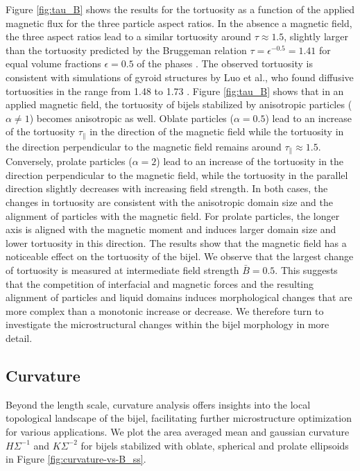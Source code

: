 Figure \ref{fig:tau_B} shows the results for the tortuosity as a
function of the applied magnetic flux for the three particle aspect
ratios. In the absence a magnetic field, the three aspect ratios lead to
a similar tortuosity around $\tau\approx 1.5$, slightly larger than
the tortuosity predicted by the Bruggeman relation
\(\tau=\epsilon^{-0.5}=1.41\) for equal volume fractions
\(\epsilon=0.5\) of the phases
\cite{bruggeman1935tortuosity, tjaden_origin_2016}. The observed
tortuosity is consistent with simulations of gyroid structures by Luo et
al., who found diffusive tortuosities in the range from 1.48 to 1.73
\cite{luo_macroscopic_2020}. Figure \ref{fig:tau_B} shows that in an
applied magnetic field, the tortuosity of bijels stabilized by
anisotropic particles (\(\alpha\neq1\)) becomes anisotropic as well.
Oblate particles (\(\alpha=0.5\)) lead to an increase of the tortuosity
\(\tau_\parallel\) in the direction of the magnetic field while the
tortuosity in the direction perpendicular to the magnetic field remains
around \(\tau_\parallel\approx1.5\). Conversely, prolate particles
(\(\alpha=2\)) lead to an increase of the tortuosity in the direction
perpendicular to the magnetic field, while the tortuosity in the
parallel direction slightly decreases with increasing field strength. In
both cases, the changes in tortuosity are consistent with the
anisotropic domain size and the alignment of particles with the magnetic
field. For prolate particles, the longer axis is aligned with the
magnetic moment and induces larger domain size and lower tortuosity in
this direction. The results show that the magnetic field has a
noticeable effect on the tortuosity of the bijel. We observe that the
largest change of tortuosity is measured at intermediate field strength
\(\bar{B}=0.5\). This suggests that the competition of interfacial and
magnetic forces and the resulting alignment of particles and liquid
domains induces morphological changes that are more complex than a
monotonic increase or decrease. We therefore turn to investigate the
microstructural changes within the bijel morphology in more detail.

\subsection{Curvature}

Beyond the length scale, curvature analysis offers insights into the
local topological landscape of the bijel, facilitating further
microstructure optimization for various applications.
\cite{reeves_quantitative_2016} We plot the area averaged mean and
gaussian curvature \(H\Sigma^{-1}\) and \(K\Sigma^{-2}\) for bijels
stabilized with oblate, spherical and prolate ellipsoids in Figure
\ref{fig:curvature-vs-B_ss}. 

